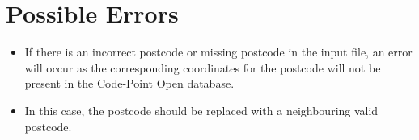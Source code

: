 \documentclass[a4paper]{article}
\begin{document}
\section{Possible Errors}
\begin{itemize}[leftmargin=*]
	\item If there is an incorrect postcode or missing postcode in the input file, an error will occur as the corresponding coordinates for the postcode will not be present in the Code-Point Open database.
	\item In this case, the postcode should be replaced with a neighbouring valid postcode.
\end{itemize}
\end{document}
